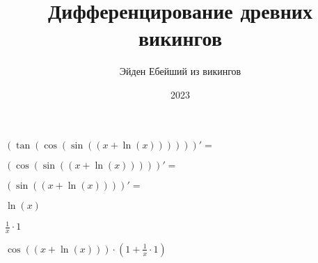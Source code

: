 \documentclass[a4paper,12pt]{article}
\title{\textbf{Дифференцирование древних викингов}}
\author{Эйден Ебейший из викингов}
\date{2023}
\begin{document}
\maketitle


\begin{center}
\begin{math}

(\tan(\cos(\sin((x + \ln(x))))))' = 

\end{math}
\end{center}



\begin{center}
\begin{math}

(\cos(\sin((x + \ln(x)))))' = 

\end{math}
\end{center}



\begin{center}
\begin{math}

(\sin((x + \ln(x))))' = 

\end{math}
\end{center}



\begin{center}
\begin{math}

\ln(x)

\end{math}
\end{center}



\begin{center}
\begin{math}

 \frac{1 }{ x }  \cdot 1

\end{math}
\end{center}



\begin{center}
\begin{math}

\cos((x + \ln(x))) \cdot (1 +  \frac{1 }{ x }  \cdot 1)

\end{math}
\end{center}
\end{document}
